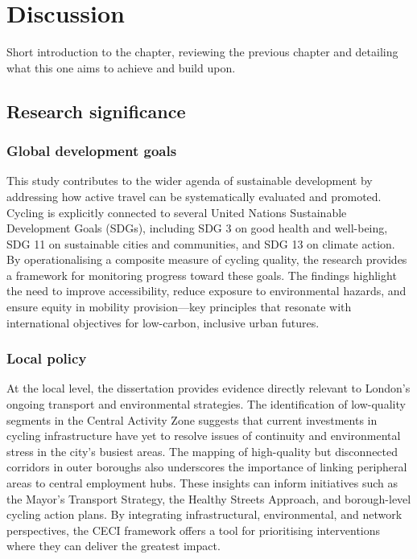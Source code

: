 \documentclass[
  12pt,
  oneside]{book}
\begin{document}
\chapter{Discussion}\label{discussion}

Short introduction to the chapter, reviewing the previous chapter and detailing what this one aims to achieve and build upon.

\section{Research significance}\label{research-significance}

\subsection{Global development goals}\label{global-development-goals}

This study contributes to the wider agenda of sustainable development by addressing how active travel can be systematically evaluated and promoted. Cycling is explicitly connected to several United Nations Sustainable Development Goals (SDGs), including SDG 3 on good health and well-being, SDG 11 on sustainable cities and communities, and SDG 13 on climate action. By operationalising a composite measure of cycling quality, the research provides a framework for monitoring progress toward these goals. The findings highlight the need to improve accessibility, reduce exposure to environmental hazards, and ensure equity in mobility provision---key principles that resonate with international objectives for low-carbon, inclusive urban futures.

\subsection{Local policy}\label{local-policy}

At the local level, the dissertation provides evidence directly relevant to London's ongoing transport and environmental strategies. The identification of low-quality segments in the Central Activity Zone suggests that current investments in cycling infrastructure have yet to resolve issues of continuity and environmental stress in the city's busiest areas. The mapping of high-quality but disconnected corridors in outer boroughs also underscores the importance of linking peripheral areas to central employment hubs. These insights can inform initiatives such as the Mayor's Transport Strategy, the Healthy Streets Approach, and borough-level cycling action plans. By integrating infrastructural, environmental, and network perspectives, the CECI framework offers a tool for prioritising interventions where they can deliver the greatest impact.
\end{document}

